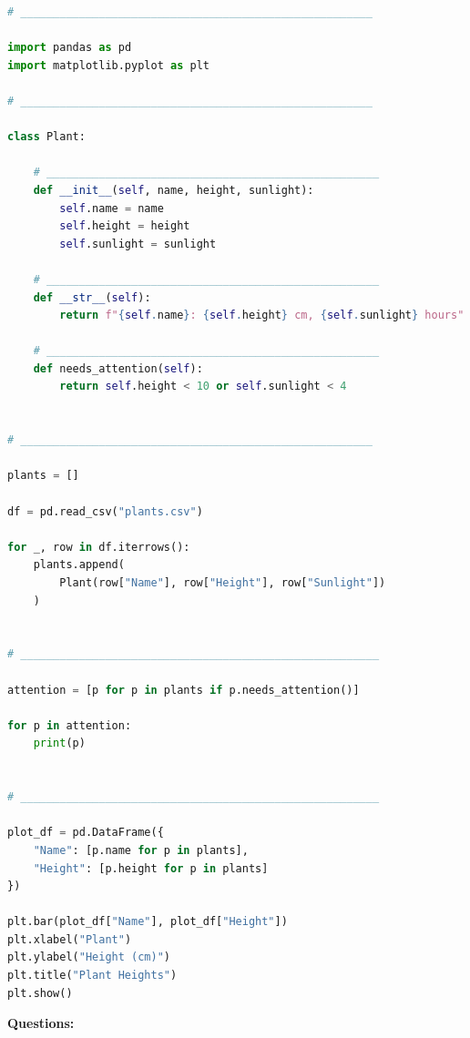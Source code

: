 \documentclass[12pt]{article}
\begin{document}
\begin{lstlisting}[language=Python]
# ______________________________________________________

import pandas as pd
import matplotlib.pyplot as plt

# ______________________________________________________

class Plant:

    # ___________________________________________________
    def __init__(self, name, height, sunlight):
        self.name = name
        self.height = height
        self.sunlight = sunlight

    # ___________________________________________________
    def __str__(self):
        return f"{self.name}: {self.height} cm, {self.sunlight} hours"

    # ___________________________________________________
    def needs_attention(self):
        return self.height < 10 or self.sunlight < 4


# ______________________________________________________

plants = []

df = pd.read_csv("plants.csv")

for _, row in df.iterrows():
    plants.append(
        Plant(row["Name"], row["Height"], row["Sunlight"])
    )


# _______________________________________________________

attention = [p for p in plants if p.needs_attention()]

for p in attention:
    print(p)


# _______________________________________________________

plot_df = pd.DataFrame({
    "Name": [p.name for p in plants],
    "Height": [p.height for p in plants]
})

plt.bar(plot_df["Name"], plot_df["Height"])
plt.xlabel("Plant")
plt.ylabel("Height (cm)")
plt.title("Plant Heights")
plt.show()
\end{lstlisting}

\noindent\textbf{Questions:}
\end{document}
